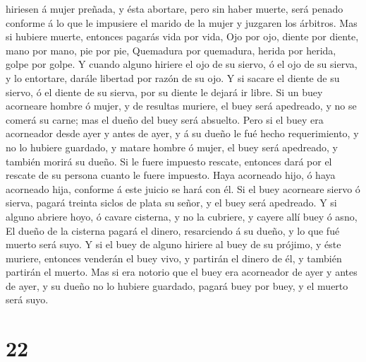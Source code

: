 hiriesen á mujer preñada, y ésta abortare, pero sin haber muerte, será
penado conforme á lo que le impusiere el marido de la mujer y juzgaren
los árbitros.  Mas si hubiere muerte, entonces pagarás
vida por vida,  Ojo por ojo, diente por diente, mano por
mano, pie por pie,  Quemadura por quemadura, herida por
herida, golpe por golpe.  Y cuando alguno hiriere el ojo
de su siervo, ó el ojo de su sierva, y lo entortare, darále libertad por
razón de su ojo.  Y si sacare el diente de su siervo, ó
el diente de su sierva, por su diente le dejará ir libre.
 Si un buey acorneare hombre ó mujer, y de resultas
muriere, el buey será apedreado, y no se comerá su carne; mas el dueño
del buey será absuelto.  Pero si el buey era acorneador
desde ayer y antes de ayer, y á su dueño le fué hecho requerimiento, y
no lo hubiere guardado, y matare hombre ó mujer, el buey será apedreado,
y también morirá su dueño.  Si le fuere impuesto rescate,
entonces dará por el rescate de su persona cuanto le fuere impuesto.
 Haya acorneado hijo, ó haya acorneado hija, conforme á
este juicio se hará con él.  Si el buey acorneare siervo
ó sierva, pagará treinta siclos de plata su señor, y el buey será
apedreado.  Y si alguno abriere hoyo, ó cavare cisterna,
y no la cubriere, y cayere allí buey ó asno,  El dueño de
la cisterna pagará el dinero, resarciendo á su dueño, y lo que fué
muerto será suyo.  Y si el buey de alguno hiriere al buey
de su prójimo, y éste muriere, entonces venderán el buey vivo, y
partirán el dinero de él, y también partirán el muerto. 
Mas si era notorio que el buey era acorneador de ayer y antes de ayer, y
su dueño no lo hubiere guardado, pagará buey por buey, y el muerto será
suyo.

\hypertarget{section-21}{%
\section{22}\label{section-21}}

